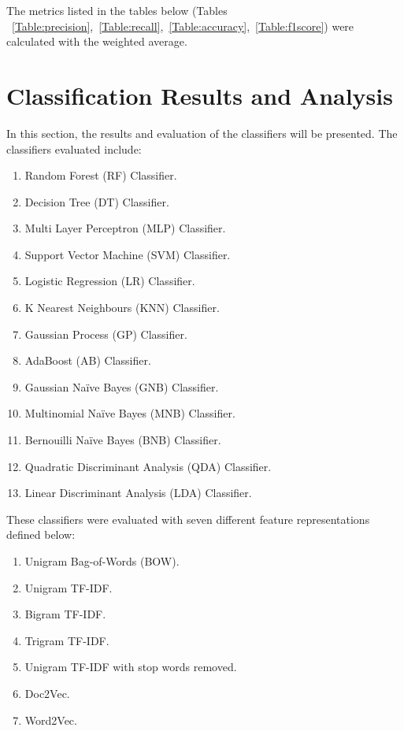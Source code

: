 The metrics listed in the tables below (Tables ~\ref{Table:precision},~\ref{Table:recall},~\ref{Table:accuracy},~\ref{Table:f1score}) were calculated with the weighted average.

\section{Classification Results and Analysis}

In this section, the results and evaluation of the classifiers will be presented. The classifiers evaluated include:
\begin{enumerate}
    \item Random Forest (RF) Classifier.
    \item Decision Tree (DT) Classifier.
    \item Multi Layer Perceptron (MLP) Classifier.
    \item Support Vector Machine (SVM) Classifier.
    \item Logistic Regression (LR) Classifier.
    \item K Nearest Neighbours (KNN) Classifier.
    \item Gaussian Process (GP) Classifier.
    \item AdaBoost (AB) Classifier.
    \item Gaussian Naïve Bayes (GNB) Classifier.
    \item Multinomial Naïve Bayes (MNB) Classifier.
    \item Bernouilli Naïve Bayes (BNB) Classifier.
    \item Quadratic Discriminant Analysis (QDA) Classifier.
    \item Linear Discriminant Analysis (LDA) Classifier.
\end{enumerate}

These classifiers were evaluated with seven different feature representations defined below:
\begin{enumerate}
    \item Unigram Bag-of-Words (BOW).
    \item Unigram TF-IDF.
    \item Bigram TF-IDF.
    \item Trigram TF-IDF.
    \item Unigram TF-IDF with stop words removed.
    \item Doc2Vec.
    \item Word2Vec.
\end{enumerate}

